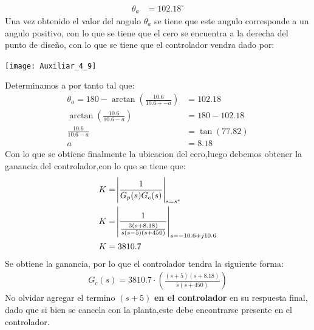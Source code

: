 \documentclass[
  11pt,
  letterpaper,
   addpoints,
   answers
  ]{exam}
\begin{document}
\begin{questions}
\begin{solution}
\begin{align}
    \theta_{a} &= 102.18^{\circ}
\end{align}
Una vez obtenido el valor del angulo $\theta_{a}$ se tiene que este angulo corresponde a un angulo positivo, con lo que se tiene que el cero se encuentra a la derecha del punto de diseño, con lo que se tiene que el controlador vendra dado por:
\begin{center}
    \texttt{[image: Auxiliar\_4\_9]}
\end{center}
Determinamos a por tanto tal que:
\begin{align}
    \theta_{a} = 180 - \arctan(\frac{10.6}{10.6+-a}) &= 102.18\\
    \arctan(\frac{10.6}{10.6-a}) &= 180 - 102.18\\
    \frac{10.6}{10.6-a} &= \tan(77.82)\\
    a &= 8.18
\end{align}
Con lo que se obtiene finalmente la ubicacion del cero,luego debemos obtener la ganancia del controlador,con lo que se tiene que:
\begin{align}
    K &= \abs{\frac{1}{G_{p}(s)G_{c}(s)}}_{s=s^{*}}\\
    K &= \abs{\frac{1}{\frac{3(s+8.18)}{s(s-5)(s+450)}}}_{s=-10.6+j10.6}\\
    K &= 3810.7
\end{align}
Se obtiene la ganancia, por lo que el controlador tendra la siguiente forma:
\begin{align}
    G_{c}(s) = 3810.7\cdot \left(\frac{(s+5)(s+8.18)}{s(s+450)}\right)
\end{align}
No olvidar agregar el termino $(s+5)$ \textbf{en el controlador} en su respuesta final, dado que si bien se cancela con la planta,este debe encontrarse presente en el controlador.

\end{solution}
\end{questions}
\end{document}
